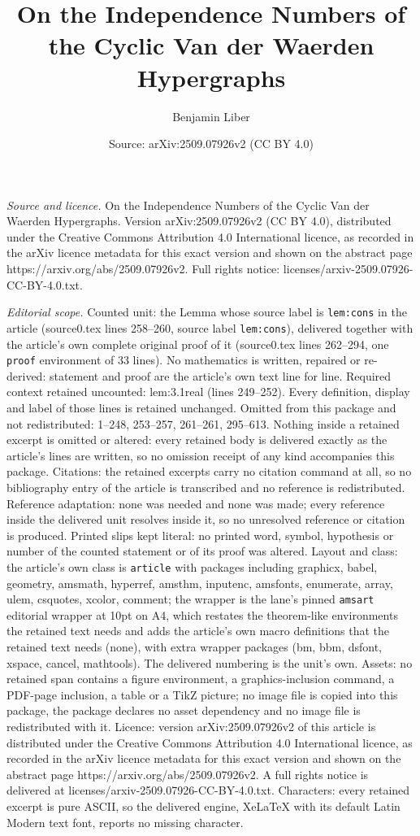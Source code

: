 \documentclass[10pt,a4paper]{amsart}
\title[On the Independence Numbers of the Cyclic Van der Waerden Hy]{On the Independence Numbers of the Cyclic Van der Waerden Hypergraphs}
\author{Benjamin Liber}
\date{Source: arXiv:2509.07926v2 (CC BY 4.0)}
\begin{document}
\maketitle

\noindent\emph{Source and licence.} On the Independence Numbers of the Cyclic Van der Waerden Hypergraphs. Version arXiv:2509.07926v2 (CC BY 4.0), distributed under the Creative Commons Attribution 4.0 International licence, as recorded in the arXiv licence metadata for this exact version and shown on the abstract page https://arxiv.org/abs/2509.07926v2. Full rights notice: licenses/arxiv-2509.07926-CC-BY-4.0.txt.\par\smallskip

\noindent\textit{Editorial scope.} Counted unit: the Lemma whose source label is \texttt{lem:cons} in the article (source0.tex lines 258--260, source label \texttt{lem:cons}), delivered together with the article's own complete original proof of it (source0.tex lines 262--294, one \texttt{proof} environment of 33 lines). No mathematics is written, repaired or re-derived: statement and proof are the article's own text line for line. Required context retained uncounted: lem:3.1real (lines 249--252). Every definition, display and label of those lines is retained unchanged. Omitted from this package and not redistributed: 1--248, 253--257, 261--261, 295--613. Nothing inside a retained excerpt is omitted or altered: every retained body is delivered exactly as the article's lines are written, so no omission receipt of any kind accompanies this package. Citations: the retained excerpts carry no citation command at all, so no bibliography entry of the article is transcribed and no reference is redistributed. Reference adaptation: none was needed and none was made; every reference inside the delivered unit resolves inside it, so no unresolved reference or citation is produced. Printed slips kept literal: no printed word, symbol, hypothesis or number of the counted statement or of its proof was altered. Layout and class: the article's own class is \texttt{article} with packages including graphicx, babel, geometry, amsmath, hyperref, amsthm, inputenc, amsfonts, enumerate, array, ulem, csquotes, xcolor, comment; the wrapper is the lane's pinned \texttt{amsart} editorial wrapper at 10pt on A4, which restates the theorem-like environments the retained text needs and adds the article's own macro definitions that the retained text needs (none), with extra wrapper packages (bm, bbm, dsfont, xspace, cancel, mathtools). The delivered numbering is the unit's own. Assets: no retained span contains a figure environment, a graphics-inclusion command, a PDF-page inclusion, a table or a TikZ picture; no image file is copied into this package, the package declares no asset dependency and no image file is redistributed with it. Licence: version arXiv:2509.07926v2 of this article is distributed under the Creative Commons Attribution 4.0 International licence, as recorded in the arXiv licence metadata for this exact version and shown on the abstract page https://arxiv.org/abs/2509.07926v2. A full rights notice is delivered at licenses/arxiv-2509.07926-CC-BY-4.0.txt. Characters: every retained excerpt is pure ASCII, so the delivered engine, XeLaTeX with its default Latin Modern text font, reports no missing character.
\end{document}
